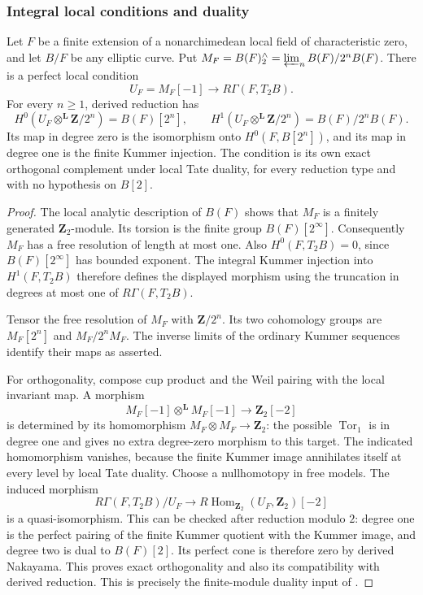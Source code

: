 \subsubsection{Integral local conditions and duality}

\begin{lemma}\label{rl:kummer}
\label{lem:h:duality}
Let $F$ be a finite extension of a nonarchimedean local field of
characteristic zero, and let $B/F$ be any elliptic curve.  Put
$M_F=B(F)^\wedge_2=\varprojlim_n B(F)/2^nB(F)$.  There is a perfect local
condition
\[
 U_F=M_F[-1]\longrightarrow R\Gamma(F,T_2B).
\]
For every $n\geq1$, derived reduction has
\[
 H^0(U_F\otimes^{\mathbf L}\mathbf Z/2^n)=B(F)[2^n],\qquad
 H^1(U_F\otimes^{\mathbf L}\mathbf Z/2^n)=B(F)/2^nB(F).
\]
Its map in degree zero is the isomorphism onto
$H^0(F,B[2^n])$, and its map in degree one is the finite Kummer injection.
The condition is its own exact orthogonal complement under local Tate
duality, for every reduction type and with no hypothesis on $B[2]$.
\end{lemma}

\begin{proof}
The local analytic description of $B(F)$ shows that $M_F$ is a finitely
generated $\mathbf Z_2$-module.  Its torsion is the finite group
$B(F)[2^\infty]$.  Consequently $M_F$ has a free resolution of length at
most one.  Also $H^0(F,T_2B)=0$, since $B(F)[2^\infty]$ has bounded
exponent.  The integral Kummer injection into $H^1(F,T_2B)$ therefore
defines the displayed morphism using the truncation in degrees at most
one of $R\Gamma(F,T_2B)$.

Tensor the free resolution of $M_F$ with $\mathbf Z/2^n$.  Its two
cohomology groups are $M_F[2^n]$ and $M_F/2^nM_F$. The inverse limits
of the ordinary Kummer sequences identify their maps as asserted.

For orthogonality, compose cup product and the Weil pairing with the local
invariant map.  A morphism
\[
 M_F[-1]\otimes^{\mathbf L}M_F[-1]
       \longrightarrow\mathbf Z_2[-2]
\]
is determined by its homomorphism $M_F\otimes M_F\to\mathbf Z_2$:
the possible $\operatorname{Tor}_1$ is in degree one and gives no extra
degree-zero morphism to this target.  The indicated homomorphism vanishes,
because the finite Kummer image annihilates itself at every level by local
Tate duality.  Choose a nullhomotopy in free models.  The induced morphism
\[
 R\Gamma(F,T_2B)/U_F
       \longrightarrow R\operatorname{Hom}_{\mathbf Z_2}
                         (U_F,\mathbf Z_2)[-2]
\]
is a quasi-isomorphism.  This can be checked after reduction modulo $2$:
degree one is the perfect pairing of the finite Kummer quotient with the
Kummer image, and degree two is dual to $B(F)[2]$.  Its perfect cone is
therefore zero by derived Nakayama.  This proves exact orthogonality and
also its compatibility with derived reduction.  This is precisely the
finite-module duality input of \cite[Proposition~5.2.4]{Nekovar2006}.
\end{proof}

